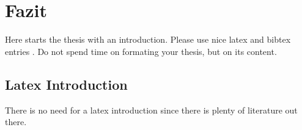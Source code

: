 \chapter{Fazit}

Here starts the thesis with an introduction. Please use nice latex and bibtex entries \cite{latex}. Do not spend time on formating your thesis, but on its content.

\section{Latex Introduction}
There is no need for a latex introduction since there is plenty of literature out there.

